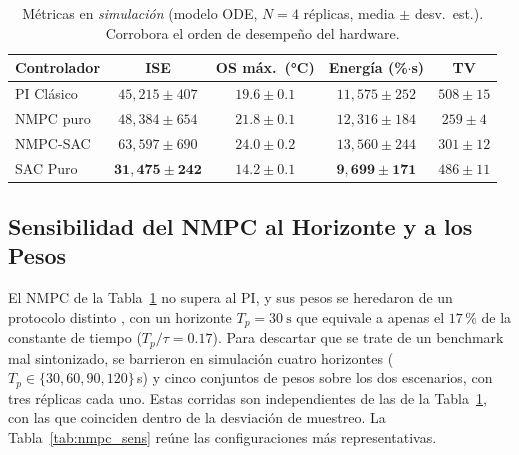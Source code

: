 \documentclass[processes,article,submit,moreauthors,pdftex]{Definitions/mdpi}
\begin{document}
\begin{table}[H]
\caption{Métricas en \emph{simulación} (modelo ODE, $N=4$ réplicas,
         media $\pm$ desv.\ est.). Corrobora el orden de desempeño del
         hardware.}
\label{tab:metricas_sim}
\begin{tabular}{lcccc}
\toprule
\textbf{Controlador} & \textbf{ISE} & \textbf{OS máx.\ (\si{\celsius})} &
\textbf{Energía (\%$\cdot$s)} & \textbf{TV} \\
\midrule
PI Clásico & $45{,}215 \pm 407$ & $19.6 \pm 0.1$ & $11{,}575 \pm 252$ & $508 \pm 15$ \\
NMPC puro  & $48{,}384 \pm 654$ & $21.8 \pm 0.1$ & $12{,}316 \pm 184$ & $259 \pm 4$ \\
NMPC-SAC   & $63{,}597 \pm 690$ & $24.0 \pm 0.2$ & $13{,}560 \pm 244$ & $301 \pm 12$ \\
SAC Puro   & $\mathbf{31{,}475 \pm 242}$ & $\mathbf{14.2 \pm 0.1}$ & $\mathbf{9{,}699 \pm 171}$ & $486 \pm 11$ \\
\bottomrule
\end{tabular}
\end{table}

\subsection{Sensibilidad del NMPC al Horizonte y a los Pesos}
\label{subsec:nmpc_sensitivity}

El NMPC de la Tabla~\ref{tab:metricas_sim} no supera al PI, y sus pesos se
heredaron de un protocolo distinto \cite{SozaMamani2025}, con un horizonte
$T_p = \SI{30}{\second}$ que equivale a apenas el $17\,\%$ de la constante de
tiempo ($T_p/\tau = 0.17$). Para descartar que se trate de un benchmark mal
sintonizado, se barrieron en simulación cuatro horizontes
($T_p \in \{30, 60, 90, 120\}$\,s) y cinco conjuntos de pesos sobre los dos
escenarios, con tres réplicas cada uno. Estas corridas son independientes de
las de la Tabla~\ref{tab:metricas_sim}, con las que coinciden dentro de la
desviación de muestreo. La Tabla~\ref{tab:nmpc_sens} reúne las configuraciones
más representativas.
\end{document}

